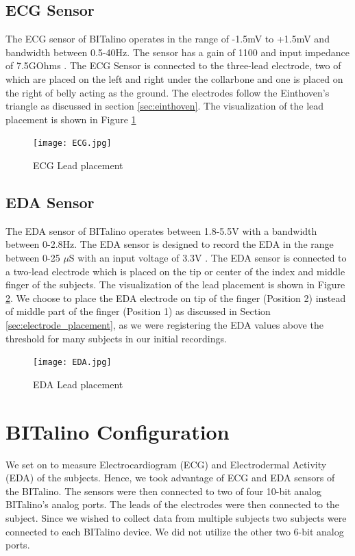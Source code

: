 \subsection{ECG Sensor}
The ECG sensor of BITalino operates in the range of -1.5mV to +1.5mV and bandwidth between 0.5-40Hz. The sensor has a gain of 1100 and input impedance of 7.5GOhms \cite{ecg_datasheet}. The ECG Sensor is connected to the three-lead electrode, two of which are placed on the left and right under the collarbone and one is placed on the right of belly acting as the ground. The electrodes follow the Einthoven's triangle as discussed in section \ref{sec:einthoven}. The visualization of the lead placement is shown in Figure \ref{fig:ecg_lead_placement}
\begin{figure}
\centering
\texttt{[image: ECG.jpg]}
\caption{ECG Lead placement}
\label{fig:ecg_lead_placement}
\end{figure}
\subsection{EDA Sensor}
\label{sec:eda_sensor}
The EDA sensor of BITalino operates between 1.8-5.5V with a bandwidth between 0-2.8Hz. The EDA sensor is designed to record the EDA in the range between 0-25 $\mu$S with an input voltage of 3.3V \cite{eda_datasheet}. The EDA sensor is connected to a two-lead electrode which is placed on the tip or center of the index and middle finger of the subjects. The visualization of the lead placement is shown in Figure \ref{fig:eda_lead_placement}. We choose to place the EDA electrode on tip of the finger (Position 2) instead of middle part of the finger (Position 1) as discussed in Section \ref{sec:electrode_placement}, as we were registering the EDA values above the threshold for many subjects in our initial recordings.
\begin{figure}
\centering
\texttt{[image: EDA.jpg]}
\caption{EDA Lead placement}
\label{fig:eda_lead_placement}
\end{figure}

\section{BITalino Configuration}
We set on to measure Electrocardiogram (ECG) and Electrodermal Activity (EDA) of the subjects. Hence, we took advantage of ECG and EDA sensors of the BITalino. The sensors were then connected to two of four 10-bit analog BITalino’s analog ports. The leads of the electrodes were then connected to the subject. Since we wished to collect data from multiple subjects two subjects were connected to each BITalino device. We did not utilize the other two 6-bit analog ports. 
